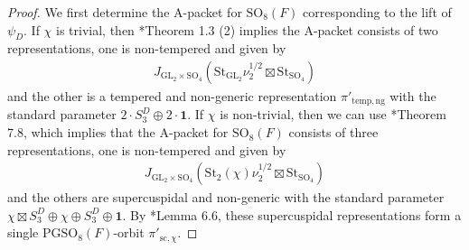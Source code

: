 \documentclass[12pt]{amsart}
\theoremstyle{definition}
\theoremstyle{plain}
\theoremstyle{remark}
\def\GL{\mathrm{GL}}
\def\SO{\mathrm{SO}}
\def\PGSO{\mathrm{PGSO}}
\numberwithin{equation}{section}
\newcommand{\temp}{\mathrm{temp}}
\newcommand{\St}{\mathrm{St}}
\begin{document}
\begin{proof}
      We first determine the A-packet for $\SO_8(F)$ corresponding to the lift of $\psi_D$.
      If $\chi$ is trivial, then \cite{Xu2021-NonarchimedeanComponentsNonEndoscopicAutomorphicRepresentations}*{Theorem 1.3 (2)} implies the A-packet consists of two representations, one is non-tempered and given by
      \begin{align*}
            J_{\GL_2 \times \SO_4}(\St_{\GL_2} \nu_2^{1/2} \boxtimes \St_{\SO_4})
      \end{align*}
      and the other is a tempered and non-generic representation $\pi'_{\temp, \mathrm{ng}}$ with the standard parameter $2 \cdot S_3^D \oplus 2 \cdot \mathbf{1}$.
      If $\chi$ is non-trivial, then we can use \cite{Xu2017-MoeglinParametrizationArthurPackets}*{Theorem 7.8}, which implies that the A-packet for $\SO_8(F)$ consists of three representations, one is non-tempered and given by
      \begin{align*}
            J_{\GL_2 \times \SO_4}(\St_{2}(\chi) \nu_2^{1/2} \boxtimes \St_{\SO_4})
      \end{align*}
      and the others are supercuspidal and non-generic with the standard parameter $\chi \boxtimes S_3^D \oplus \chi \oplus S_3^D \oplus \mathbf{1}$.
      By \cite{Xu2018-LPacketsQuasisplitGSp2nGO2n}*{Lemma 6.6}, these supercuspidal representations form a single $\PGSO_8(F)$-orbit $\pi'_{\mathrm{sc}, \chi}$.
      

\end{proof}
\end{document}
